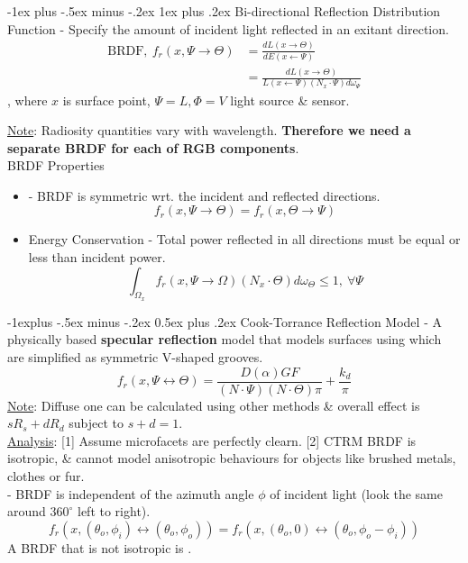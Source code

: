 \documentclass[10pt,landscape,letterpaper]{article}
\makeatletter
\renewcommand{\subsection}{\@startsection{subsection}{2}{0mm}%
                                {-1explus -.5ex minus -.2ex}%
                                {0.5ex plus .2ex}%
                                {\sffamily\normalsize\itshape}}
\renewcommand{\subsubsection}{\@startsection{subsubsection}{3}{0mm}%
                                {-1ex plus -.5ex minus -.2ex}%
                                {1ex plus .2ex}%
                                {\normalfont\small\itshape}}
\makeatother
\begin{document}
\begin{multicols}{3}
\subsubsection{Bi-directional Reflection Distribution Function}
 - Specify the amount of incident light reflected in an exitant direction.
\[
\begin{aligned}
\text{BRDF}, \ f_r(x, \Psi \to \Theta)
&= \frac{dL(x \to \Theta)}{dE(x \leftarrow \Psi)}
\\
&= \frac{dL(x\to \Theta)}{L(x \leftarrow \Psi)(N_x \cdot \Psi) d\omega_\Psi}
\end{aligned}
\]
, where $x$ is surface point, $\Psi = L, \Phi = V$ light source \& sensor.

\underline{Note}: Radiosity quantities vary with wavelength. \textbf{Therefore we need a separate BRDF for each of RGB components}.
\\

BRDF Properties
\begin{itemize}
    \item {} - BRDF is symmetric wrt. the incident and reflected directions.
    \[
    f_r(x, \Psi \to \Theta) = f_r(x, \Theta \to \Psi)
    \]
    \item Energy Conservation - Total power reflected in all directions must be equal or less than incident power.
    \[
    \int_{\Omega_x} f_r(x, \Psi\to\Omega) (N_x \cdot\Theta)d\omega_\Theta \le 1, \ \forall \Psi
    \]
\end{itemize}



\subsection{Cook-Torrance Reflection Model}
 - A physically based \textbf{specular reflection} model that models surfaces using  which are simplified as symmetric V-shaped grooves.
\[
f_r(x, \Psi \leftrightarrow \Theta) = \frac{D(\alpha) GF}{(N\cdot \Psi)(N\cdot \Theta)\pi} 
+ \frac{k_d}{\pi}
\]
\underline{Note}: Diffuse one can be calculated using other methods \& overall effect is $sR_s + dR_d$ subject to $s+d=1$.
\\
\underline{Analysis}: [1] Assume microfacets are perfectly clearn. [2] CTRM BRDF is isotropic, \& cannot model anisotropic behaviours for objects like brushed metals, clothes or fur.
\\
 - BRDF is independent of the azimuth angle $\phi$ of incident light (look the same around $360^\circ$ left to right).
\[
f_r(x, (\theta_o, \phi_i) \leftrightarrow (\theta_o, \phi_o))
= f_r(x, (\theta_o, 0) \leftrightarrow (\theta_o, \phi_o - \phi_i))
\]
A BRDF that is not isotropic is .


\end{multicols}
\end{document}
